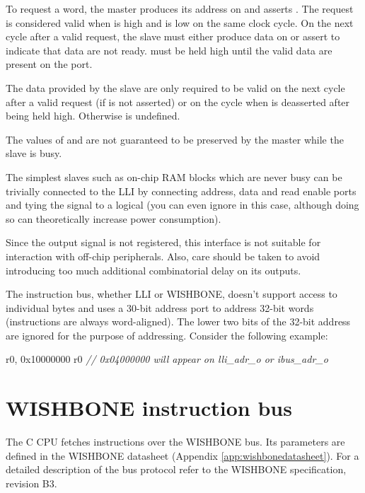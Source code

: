 \documentclass[a4paper,12pt,twoside,extrafontsizes]{memoir}
\begin{document}
To request a word, the master produces its address on  and asserts . The request is considered valid when  is high and  is low on the same clock cycle. On the next cycle after a valid request, the slave must either produce data on  or assert  to indicate that data are not ready.  must be held high until the valid data are present on the  port.

The data provided by the slave are only required to be valid on the next cycle after a valid request (if  is not asserted) or on the cycle when  is deasserted after being held high. Otherwise  is undefined.

The values of  and  are not guaranteed to be preserved by the master while the slave is busy.

The simplest slaves such as on-chip RAM blocks which are never busy can be trivially connected to the LLI by connecting address, data and read enable ports and tying the  signal to a logical  (you can even ignore  in this case, although doing so can theoretically increase power consumption).

Since the  output signal is not registered, this interface is not suitable for interaction with off-chip peripherals. Also, care should be taken to avoid introducing too much additional combinatorial delay on its outputs.

The instruction bus, whether LLI or WISHBONE, doesn't support access to individual bytes and uses a 30-bit address port to address 32-bit words (instructions are always word-aligned). The lower two bits of the 32-bit address are ignored for the purpose of addressing. Consider the following example:

\begin{codeparbreakable}
     r0, 0x10000000
     r0
\emph{// 0x04000000 will appear on lli_adr_o or ibus_adr_o}
\end{codeparbreakable}

\section{WISHBONE instruction bus}

The \lxp{}C CPU fetches instructions over the WISHBONE bus. Its parameters are defined in the WISHBONE datasheet (Appendix \ref{app:wishbonedatasheet}). For a detailed description of the bus protocol refer to the WISHBONE specification, revision B3.
\end{document}
